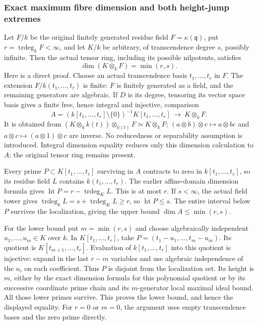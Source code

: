 \subsubsection{Exact maximum fibre dimension and both height-jump extremes}\label{exact-maximum-fibre-dimension-and-both-height-jump-extremes}

Let \(F/k\) be the original finitely generated residue field \(F=\kappa(\mathfrak q)\), put \(r=\operatorname{trdeg}_kF<\infty\), and let \(K/k\) be arbitrary, of transcendence degree \(s\), possibly infinite. Then the actual tensor ring, including its possible nilpotents, satisfies \[
 \dim(K\otimes_kF)=\min(r,s).
\] Here is a direct proof. Choose an actual transcendence basis \(t_1,\ldots,t_r\) in \(F\). The extension \(F/k(t_1,\ldots,t_r)\) is finite: \(F\) is finitely generated as a field, and the remaining generators are algebraic. If \(D\) is its degree, tensoring its vector space basis gives a finite free, hence integral and injective, comparison \[
 A=(k[t_1,\ldots,t_r]\setminus\{0\})^{-1}K[t_1,\ldots,t_r]
      \ \longrightarrow\ K\otimes_kF .
\] It is obtained from \((K\otimes_k k(t))\otimes_{k(t)}F\simeq K\otimes_kF\); \((a\otimes b)\otimes c\mapsto a\otimes bc\) and \(a\otimes c\mapsto(a\otimes1)\otimes c\) are inverse. No reducedness or separability assumption is introduced. Integral dimension equality reduces only this dimension calculation to \(A\); the original tensor ring remains present.

Every prime \(P\subset K[t_1,\ldots,t_r]\) surviving in \(A\) contracts to zero in \(k[t_1,\ldots,t_r]\), so its residue field \(L\) contains \(k(t_1,\ldots,t_r)\). The earlier affine-domain dimension formula gives \(\operatorname{ht}P=r-\operatorname{trdeg}_K L\). This is at most \(r\). If \(s<\infty\), the actual field tower gives \(\operatorname{trdeg}_k L=s+\operatorname{trdeg}_K L\geq r\), so \(\operatorname{ht}P\leq s\). The entire interval below \(P\) survives the localization, giving the upper bound \(\dim A\leq\min(r,s)\).

For the lower bound put \(m=\min(r,s)\) and choose algebraically independent \(u_1,\ldots,u_m\in K\) over \(k\). In \(K[t_1,\ldots,t_r]\), take \(P=(t_1-u_1,\ldots,t_m-u_m)\). Its quotient is \(K[t_{m+1},\ldots,t_r]\). Evaluation of \(k[t_1,\ldots,t_r]\) into this quotient is injective: expand in the last \(r-m\) variables and use algebraic independence of the \(u_i\) on each coefficient. Thus \(P\) is disjoint from the localization set. Its height is \(m\), either by the exact dimension formula for this polynomial quotient or by its successive coordinate prime chain and its \(m\)-generator local maximal ideal bound. All those lower primes survive. This proves the lower bound, and hence the displayed equality. For \(r=0\) or \(m=0\), the argument uses empty transcendence bases and the zero prime directly.

